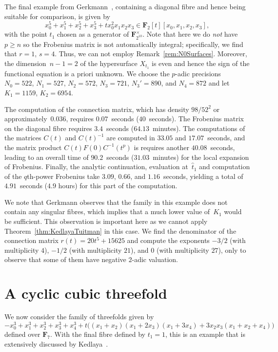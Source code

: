 The final example from Gerkmann~\citep[\S 7.6]{Gerkmann2007}, 
containing a diagonal fibre and hence being suitable for comparison, 
is given by 
\begin{equation}
x_0^5 + x_1^5 + x_2^5 + x_3^5 + t x_0^2 x_1 x_2 x_3 \in \mathbf{F}_2[t][x_0,x_1,x_2,x_3],
\end{equation}
with the point $t_1$ chosen as a generator of $\mathbf{F}_{2^{10}}^{\times}$. 
Note that here we do \emph{not} have $p \geq n$ so the Frobenius matrix is not 
automatically integral;  specifically, we find that $r = 1$, $s = 4$.  Thus, 
we can not employ Remark~\ref{rem:N0Surfaces}.  Moreover, the 
dimension~$n-1 = 2$ of the hypersurface $X_{t_1}$ is even and hence 
the sign of the functional equation is a priori unknown.
We choose the $p$-adic precisions $N_0 = 522$, $N_1 = 527$, $N_2 = 572$, 
$N_3 = 721$, $N_3' = 890$, and $N_4 = 872$ and let $K_1 = 1159$, $K_2 = 6954$.

The computation of the connection matrix, which has density $98 / 52^2$ 
or approximately~$0.036$, requires $0.07$~seconds ($40$~seconds).  
The Frobenius matrix on the diagonal fibre requires $3.4$~seconds 
($64.13$~minutes).  The computations of the matrices $C(t)$ and $C(t)^{-1}$ 
are computed in $33.05$ and $17.07$~seconds, and the matrix product 
$C(t) F(0) C^{-1}(t^p)$ is requires another $40.08$~seconds, leading 
to an overall time of $90.2$~seconds ($31.03$~minutes) for the local 
expansion of Frobenius.  Finally, the analytic continuation, evaluation 
at~$\hat{t}_1$ and computation of the $q$th-power Frobenius take $3.09$, 
$0.66$, and $1.16$~seconds, yielding a total of $4.91$~seconds ($4.9$ hours) 
for this part of the computation.

We note that Gerkmann observes that the family in this example does 
not contain any singular fibres, which implies that a much lower value 
of~$K_1$ would be sufficient.  This observation is important here as we 
cannot apply Theorem~\ref{thm:KedlayaTuitman} in this case.  
We find the denominator of the connection matrix $r(t) = 20 t^5+15625$ 
and compute the exponents $-3/2$ (with multiplicity $4$), 
$-1/2$ (with multiplicity $21$), and $0$ (with multiplicity $27$), 
only to observe that some of them have negative $2$-adic valuation.

\section{A cyclic cubic threefold}

We now consider the family of threefolds given by 
\begin{equation}
-x_0^3 + x_1^3 + x_2^3 + x_3^3 + x_4^3 
+ t\bigl((x_1+x_2)(x_1+2x_3)(x_1+3x_4) + 3 x_2 x_3 (x_1 + x_2 + x_4)\bigr) 
\end{equation}
defined over $\mathbf{F}_{7}$.  With the final fibre defined by $t_1 = 1$, 
this is an example that is extensively discussed by 
Kedlaya~\citep[Example~1.6.1]{Kedlaya2011}.  

